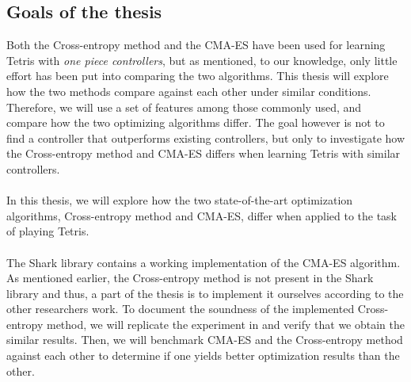 \subsection{Goals of the thesis}

Both the Cross-entropy method and the CMA-ES have been used 
for learning Tetris with \textit{one piece controllers}, but as 
mentioned, to our knowledge, only little effort has been put into 
comparing the two algorithms. This thesis will explore
how the two methods compare against each other under similar
conditions. Therefore, we will use a set of features among those
commonly used, and compare how the two optimizing algorithms 
differ. The goal however is not to find a controller that 
outperforms existing controllers, but only to investigate 
how the Cross-entropy method and CMA-ES differs when learning Tetris
with similar controllers.\\
\\
In this thesis, we will explore how the two state-of-the-art
optimization algorithms, Cross-entropy method and CMA-ES, differ when 
applied to the task of playing Tetris.\\
\\
The Shark library \citep{shark08} contains a
working implementation of the CMA-ES 
algorithm. As mentioned earlier, the Cross-entropy method 
is not present in the Shark library and thus, 
a part of the thesis is to implement it ourselves according to 
the other researchers work. To document the 
soundness of the implemented Cross-entropy method, 
we will replicate the experiment in \citep{thiery:09} and 
verify that we obtain the similar results.
Then, we will benchmark CMA-ES and the Cross-entropy method against each other 
to determine if one yields better optimization results than the other.
